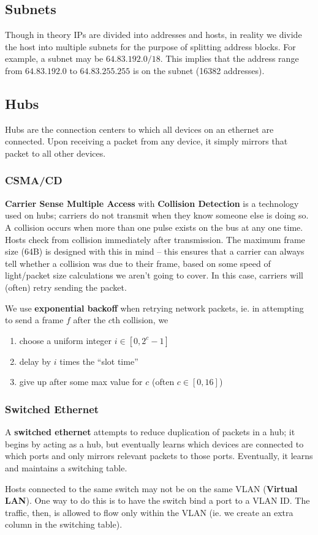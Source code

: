 \documentclass[12pt]{article}
\begin{document}
\subsection{Subnets}
Though in theory IPs are divided into addresses and hosts, in reality we divide the host into multiple subnets for the purpose of splitting address blocks. For example, a subnet may be $64.83.192.0/18$. This implies that the address range from $64.83.192.0$ to $64.83.255.255$ is on the subnet (16382 addresses).

\subsection{Hubs}
Hubs are the connection centers to which all devices on an ethernet are connected. Upon receiving a packet from any device, it simply mirrors that packet to all other devices.

\subsubsection{CSMA/CD}
{\bf Carrier Sense Multiple Access} with {\bf Collision Detection} is a technology used on hubs; carriers do not transmit when they know someone else is doing so. A collision occurs when more than one pulse exists on the bus at any one time. Hosts check from collision immediately after transmission. The maximum frame size (64B) is designed with this in mind -- this ensures that a carrier can always tell whether a collision was due to their frame, based on some speed of light/packet size calculations we aren't going to cover. In this case, carriers will (often) retry sending the packet.

We use {\bf exponential backoff} when retrying network packets, ie. in attempting to send a frame $f$ after the $c$th collision, we
\begin{enumerate}
\item choose a uniform integer $i \in [0, 2^c-1]$
\item delay by $i$ times the ``slot time''
\item give up after some max value for $c$ (often $c \in [0,16]$)
\end{enumerate}

\subsubsection{Switched Ethernet}
A {\bf switched ethernet} attempts to reduce duplication of packets in a hub; it begins by acting as a hub, but eventually learns which devices are connected to which ports and only mirrors relevant packets to those ports. Eventually, it learns and maintains a switching table.

Hosts connected to the same switch may not be on the same VLAN ({\bf Virtual LAN}). One way to do this is to have the switch bind a port to a VLAN ID. The traffic, then, is allowed to flow only within the VLAN (ie. we create an extra column in the switching table).
\end{document}
